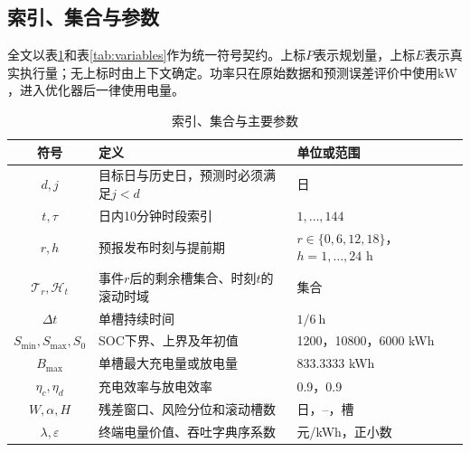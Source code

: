 \documentclass[UTF8,12pt,a4paper]{ctexart}
\theoremstyle{remark}
\begin{document}
\subsection{索引、集合与参数}
全文以表\ref{tab:index-parameters}和表\ref{tab:variables}作为统一符号契约。上标$P$表示规划量，上标$E$表示真实执行量；无上标时由上下文确定。功率只在原始数据和预测误差评价中使用$\mathrm{kW}$，进入优化器后一律使用电量。
\begin{table}[H]\centering\small\caption{索引、集合与主要参数}\label{tab:index-parameters}
\begin{tabular}{cll}\toprule 符号&定义&单位或范围\\\midrule
$d,j$&目标日与历史日，预测时必须满足$j<d$&日\\
$t,\tau$&日内10分钟时段索引&$1,\ldots,144$\\
$r,h$&预报发布时刻与提前期&$r\in\{0,6,12,18\}$，$h=1,\ldots,24$ h\\
$\mathcal T_r,\mathcal H_t$&事件$r$后的剩余槽集合、时刻$t$的滚动时域&集合\\
$\Delta t$&单槽持续时间&$1/6\ \mathrm h$\\
$S_{\min},S_{\max},S_0$&SOC下界、上界及年初值&1200，10800，6000 kWh\\
$B_{\max}$&单槽最大充电量或放电量&833.3333 kWh\\
$\eta_c,\eta_d$&充电效率与放电效率&0.9，0.9\\
$W,\alpha,H$&残差窗口、风险分位和滚动槽数&日，--，槽\\
$\lambda,\varepsilon$&终端电量价值、吞吐字典序系数&元/kWh，正小数\\\bottomrule
\end{tabular}\end{table}
\end{document}
